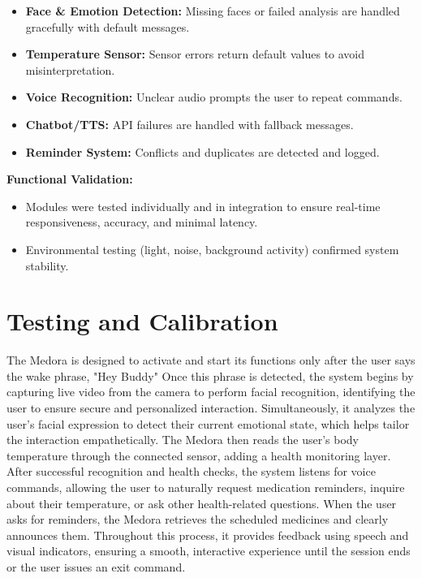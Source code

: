 \begin{itemize}
    \item \textbf{Face \& Emotion Detection:} Missing faces or failed analysis are handled gracefully with default messages.
    \item \textbf{Temperature Sensor:} Sensor errors return default values to avoid misinterpretation.
    \item \textbf{Voice Recognition:} Unclear audio prompts the user to repeat commands.
    \item \textbf{Chatbot/TTS:} API failures are handled with fallback messages.
    \item \textbf{Reminder System:} Conflicts and duplicates are detected and logged.
\end{itemize}

\noindent
\textbf{Functional Validation:}
\begin{itemize}
    \item Modules were tested individually and in integration to ensure real-time responsiveness, accuracy, and minimal latency.
    \item Environmental testing (light, noise, background activity) confirmed system stability.
\end{itemize}


\section{Testing and Calibration }

The Medora is designed to activate and start its functions only after the user says the wake phrase, "Hey Buddy" Once this phrase is detected, the system begins by capturing live video from the camera to perform facial recognition, identifying the user to ensure secure and personalized interaction. Simultaneously, it analyzes the user’s facial expression to detect their current emotional state, which helps tailor the interaction empathetically. The Medora then reads the user's body temperature through the connected sensor, adding a health monitoring layer. After successful recognition and health checks, the system listens for voice commands, allowing the user to naturally request medication reminders, inquire about their temperature, or ask other health-related questions. When the user asks for reminders, the Medora retrieves the scheduled medicines and clearly announces them. Throughout this process, it provides feedback using speech and visual indicators, ensuring a smooth, interactive experience until the session ends or the user issues an exit command.



